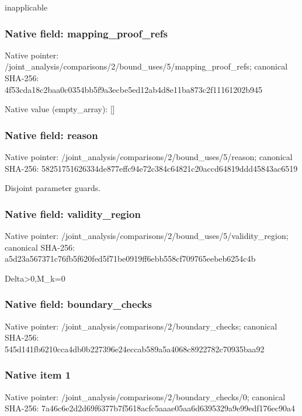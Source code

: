 \documentclass[10pt,a4paper]{article}
\begin{document}
\begingroup\raggedright\sloppy inapplicable\par\endgroup

\subsubsection{Native field: mapping\_\allowbreak{}proof\_\allowbreak{}refs}
Native pointer: /joint\_\allowbreak{}analysis/comparisons/2/bound\_\allowbreak{}uses/5/mapping\_\allowbreak{}proof\_\allowbreak{}refs; canonical SHA-256: 4f53cda18c2baa0c0354bb5f9a3ecbe5ed12ab4d8e11ba873c2f11161202b945

Native value (empty\_\allowbreak{}array): []

\subsubsection{Native field: reason}
Native pointer: /joint\_\allowbreak{}analysis/comparisons/2/bound\_\allowbreak{}uses/5/reason; canonical SHA-256: 58251751626334de877effc94e72c384c64821c20accd64819ddd45843ac6519

\begingroup\raggedright\sloppy Disjoint parameter guards.\par\endgroup

\subsubsection{Native field: validity\_\allowbreak{}region}
Native pointer: /joint\_\allowbreak{}analysis/comparisons/2/bound\_\allowbreak{}uses/5/validity\_\allowbreak{}region; canonical SHA-256: a5d23a567371c76fb5f620fed5f71be0919ff6ebb558cf709765eebeb6254c4b

\begingroup\raggedright\sloppy Delta>0,\allowbreak{}M\_\allowbreak{}k=\allowbreak{}0\par\endgroup

\subsubsection{Native field: boundary\_\allowbreak{}checks}
Native pointer: /joint\_\allowbreak{}analysis/comparisons/2/boundary\_\allowbreak{}checks; canonical SHA-256: 545d141fb6210cca4db0b227396e24eccab589a5a4068c8922782c70935baa92

\subsubsection{Native item 1}
Native pointer: /joint\_\allowbreak{}analysis/comparisons/2/boundary\_\allowbreak{}checks/0; canonical SHA-256: 7a46c6e2d2d69f6377b7f5618acfc5aaae05aa6d6395329a9e99edf176ec90a4
\end{document}
